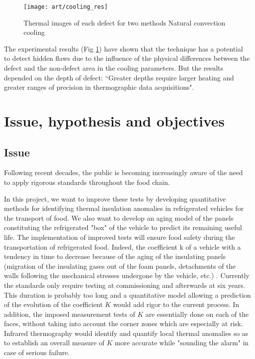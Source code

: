\begin{figure}
	\hspace{-45pt}
	\texttt{[image: art/cooling\_res]}
	\caption{Thermal images of each defect for two methods Natural convection cooling}
	\label{cooling_res}
\end{figure}
The experimental results (Fig \ref{cooling_res}) have shown that the technique has a potential to detect hidden flaws due to the influence of the physical differences between the defect and the non-defect area in the cooling parameters. But the results depended on the depth of defect: ``Greater depths require larger heating and greater ranges of precision in thermographic data acquisitions".

 
%



\section*{Issue, hypothesis and objectives}
\subsection{Issue}

Following recent decades, the public is becoming increasingly aware of the need to apply rigorous standards throughout the food chain.

In this project, we want to improve these tests by developing quantitative methods for identifying thermal insulation anomalies in refrigerated vehicles for the transport of food. We also want to develop an aging model of the panels constituting the refrigerated "box" of the vehicle to predict its remaining useful life. The implementation of improved tests will ensure food safety during the transportation of refrigerated food.
Indeed, the coefficient k of a vehicle with a tendency in time to decrease because of the aging of the insulating panels (migration of the insulating gases out of the foam panels, detachments of the walls following the mechanical stresses undergone by the vehicle, etc.) . Currently the standards only require testing at commissioning and afterwards at six years. This duration is probably too long and a quantitative model allowing a prediction of the evolution of the coefficient $K$ would add rigor to the current process. In addition, the imposed measurement tests of $K$ are essentially done on each of the faces, without taking into account the corner zones which are especially at risk. Infrared thermography would identify and quantify local thermal anomalies so as to establish an overall measure of $K$ more accurate while "sounding the alarm" in case of serious failure.

